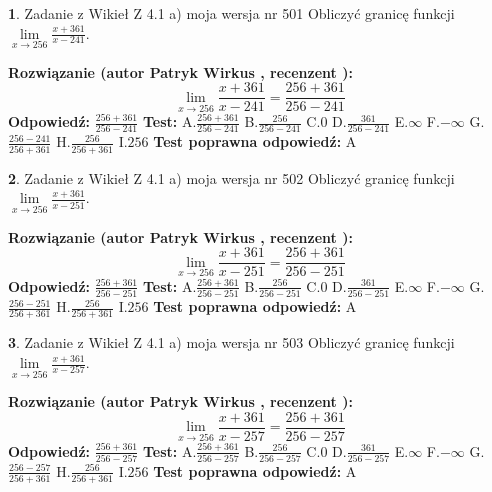 \documentclass[12pt, a4paper]{article}
\theoremstyle{definition} %
\newtheorem{zad}{}
\newcommand{\zadStart}[1]{\begin{zad}#1\newline}
\newcommand{\zadStop}{\end{zad}}
\newcommand{\rozwStart}[2]{\noindent \textbf{Rozwiązanie (autor #1 , recenzent #2): }\newline}
\newcommand{\rozwStop}{\newline}
\newcommand{\odpStart}{\noindent \textbf{Odpowiedź:}\newline}
\newcommand{\odpStop}{\newline}
\newcommand{\testStart}{\noindent \textbf{Test:}\newline}
\newcommand{\testStop}{\newline}
\newcommand{\kluczStart}{\noindent \textbf{Test poprawna odpowiedź:}\newline}
\newcommand{\kluczStop}{\newline}
\begin{document}
\zadStart{Zadanie z Wikieł Z 4.1 a) moja wersja nr 501}
Obliczyć granicę funkcji $\lim\limits_{x\to256}\frac{x+361}{x-241}$.
\zadStop
\rozwStart{Patryk Wirkus}{}
$$\lim\limits_{x\to256}\frac{x+361}{x-241} = \frac{256+361}{256-241}$$
\rozwStop
\odpStart
$\frac{256+361}{256-241}$
\odpStop
\testStart
A.$\frac{256+361}{256-241}$
B.$\frac{256}{256-241}$
C.$0$
D.$\frac{361}{256-241}$
E.$\infty$
F.$-\infty$
G.$\frac{256-241}{256+361}$
H.$\frac{256}{256+361}$
I.$256$
\testStop
\kluczStart
A
\kluczStop



\zadStart{Zadanie z Wikieł Z 4.1 a) moja wersja nr 502}
Obliczyć granicę funkcji $\lim\limits_{x\to256}\frac{x+361}{x-251}$.
\zadStop
\rozwStart{Patryk Wirkus}{}
$$\lim\limits_{x\to256}\frac{x+361}{x-251} = \frac{256+361}{256-251}$$
\rozwStop
\odpStart
$\frac{256+361}{256-251}$
\odpStop
\testStart
A.$\frac{256+361}{256-251}$
B.$\frac{256}{256-251}$
C.$0$
D.$\frac{361}{256-251}$
E.$\infty$
F.$-\infty$
G.$\frac{256-251}{256+361}$
H.$\frac{256}{256+361}$
I.$256$
\testStop
\kluczStart
A
\kluczStop



\zadStart{Zadanie z Wikieł Z 4.1 a) moja wersja nr 503}
Obliczyć granicę funkcji $\lim\limits_{x\to256}\frac{x+361}{x-257}$.
\zadStop
\rozwStart{Patryk Wirkus}{}
$$\lim\limits_{x\to256}\frac{x+361}{x-257} = \frac{256+361}{256-257}$$
\rozwStop
\odpStart
$\frac{256+361}{256-257}$
\odpStop
\testStart
A.$\frac{256+361}{256-257}$
B.$\frac{256}{256-257}$
C.$0$
D.$\frac{361}{256-257}$
E.$\infty$
F.$-\infty$
G.$\frac{256-257}{256+361}$
H.$\frac{256}{256+361}$
I.$256$
\testStop
\kluczStart
A
\kluczStop
\end{document}
